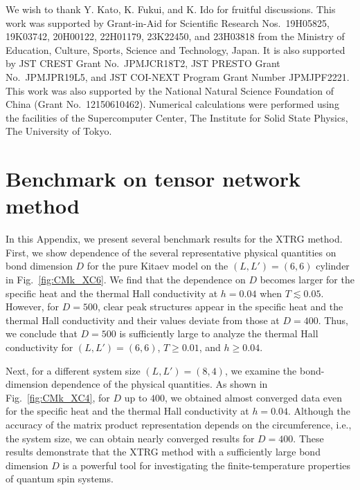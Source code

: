 \documentclass[twocolumn,superscriptaddress,showpacs, longbibliography, aps, prb]{revtex4-2}
\begin{document}
\begin{acknowledgments}
We wish to thank Y. Kato, K. Fukui, and K. Ido for fruitful discussions.
This work was supported by  Grant-in-Aid for Scientific Research
Nos.~19H05825, 19K03742, 20H00122, 	22H01179, 23K22450, and  23H03818 from the Ministry of Education, Culture, Sports, Science and Technology, Japan.
It is also supported by JST CREST Grant No.~JPMJCR18T2, JST PRESTO Grant No.~JPMJPR19L5, and JST COI-NEXT Program Grant Number JPMJPF2221. This work was also supported by the National Natural Science Foundation of China (Grant No.~12150610462). Numerical calculations were performed using the facilities of the Supercomputer Center, The Institute for Solid State Physics, The University of Tokyo.
\end{acknowledgments}

\clearpage
\appendix
\section{Benchmark on tensor network method}
\label{app:XTRG_Bench}
In this Appendix, we present several benchmark %
results for the XTRG method. 
First, we show %
dependence of the several representative 
physical quantities on bond dimension $D$ %
for the pure Kitaev model on the $(L, L') = (6, 6)$ cylinder 
in Fig.~\ref{fig:CMk_XC6}. 
We find that %
the dependence on $D$ becomes larger %
for the specific heat and the thermal Hall conductivity %
at $h=0.04$ when $T \lesssim 0.05$.
However, %
for $D=500$, 
clear peak structures appear in the specific heat and the thermal Hall conductivity %
and their values %
deviate from those %
at $D=400$. 
Thus, we conclude %
that %
$D=500$ is sufficiently large to %
analyze the thermal Hall conductivity %
for $(L, L') = (6, 6)$, $T\geq 0.01$, and $h\geq 0.04$.

Next, for %
a different system size $(L, L') = (8, 4)$, 
we examine the bond-dimension dependence of the physical quantities.
As shown in Fig.~\ref{fig:CMk_XC4}, 
for $D$ up to $400$, we obtained almost converged data even for the specific heat and the thermal Hall conductivity at $h=0.04$. 
Although the accuracy of the matrix product representation depends on the circumference, i.e., the system size, we can obtain %
nearly converged results
for $D=400$. These results demonstrate that the XTRG method with a sufficiently large bond dimension
$D$ is a powerful tool for investigating the finite-temperature properties of quantum spin systems.
\end{document}

